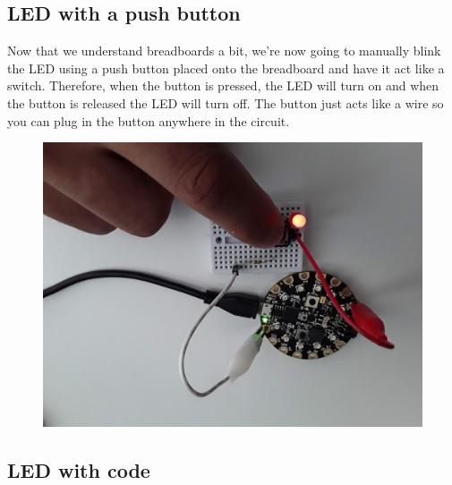 \subsection{LED with a push button}

Now that we understand breadboards a bit, we’re now going to manually
blink the LED using a push button placed 
onto the breadboard and have it act like a switch. Therefore, when the
button is pressed, the LED will turn on and when the button is
released the LED will turn off. The button just acts like a wire so
you can plug in the button anywhere in the circuit.
\begin{figure}[H]
  \begin{center}
    \includegraphics[width=\textwidth]{Figures/LED3.jpeg}
  \end{center}
\end{figure}

\subsection{LED with code}

